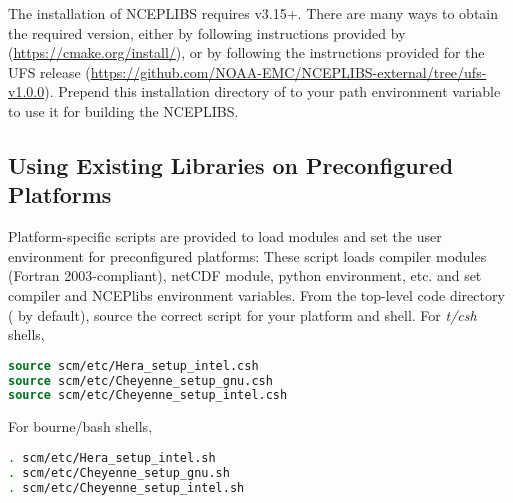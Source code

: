 The installation of NCEPLIBS requires  v3.15+. There are many ways to obtain the required version, either by following instructions provided by  (\url{https://cmake.org/install/}), or by following the instructions provided for the UFS release (\url{https://github.com/NOAA-EMC/NCEPLIBS-external/tree/ufs-v1.0.0}). Prepend this installation directory of  to your path environment variable to use it for building the NCEPLIBS.

\subsection{Using Existing Libraries on Preconfigured Platforms}\label{section: use_preconfigured_platforms}
Platform-specific scripts are provided to load modules and set the user environment for preconfigured platforms: These script loads compiler modules (Fortran 2003-compliant), netCDF module, python environment, etc. and set compiler and NCEPlibs environment variables. From the top-level code directory ( by default), source the correct script for your platform and shell. For \textit{t/csh} shells,
\begin{lstlisting}[language=csh]
source scm/etc/Hera_setup_intel.csh
source scm/etc/Cheyenne_setup_gnu.csh
source scm/etc/Cheyenne_setup_intel.csh
\end{lstlisting}
For bourne/bash shells,
\begin{lstlisting}[language=bash]
. scm/etc/Hera_setup_intel.sh
. scm/etc/Cheyenne_setup_gnu.sh
. scm/etc/Cheyenne_setup_intel.sh
\end{lstlisting}

